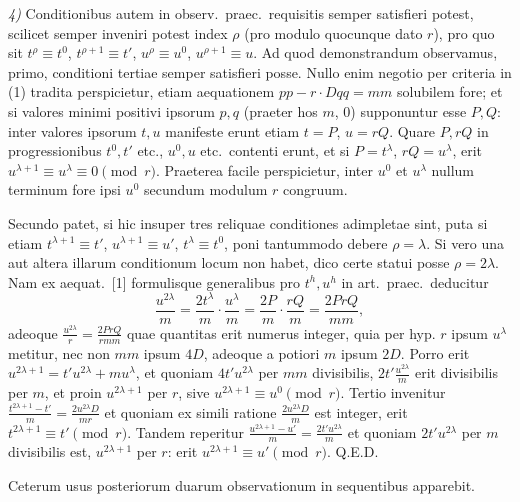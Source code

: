 \documentclass[12pt,a4paper]{article}
\theoremstyle{plain}
\theoremstyle{definition}
\theoremstyle{remark}
\begin{document}
\emph{4)} Conditionibus autem in observ.\ praec.\ requisitis semper satisfieri potest, scilicet semper inveniri potest index $\rho$ (pro modulo quocunque dato $r$), pro quo sit $t^\rho\equiv t^0$, $t^{\rho+1}\equiv t'$, $u^\rho\equiv u^0$, $u^{\rho+1}\equiv u$. Ad quod demonstrandum observamus, primo, conditioni tertiae semper satisfieri posse. Nullo enim negotio per criteria in (1) tradita perspicietur, etiam aequationem $pp-r\cdot Dqq=mm$ solubilem fore; et si valores minimi positivi ipsorum $p,q$ (praeter hos $m$, $0$) supponuntur esse $P,Q$: inter valores ipsorum $t,u$ manifeste erunt etiam $t=P$, $u=rQ$. Quare $P,rQ$ in progressionibus $t^0,t'$ etc., $u^0,u$ etc.\ contenti erunt, et si $P=t^\lambda$, $rQ=u^\lambda$, erit $u^{\lambda+1}\equiv u^\lambda\equiv0\pmod{r}$. Praeterea facile perspicietur, inter $u^0$ et $u^\lambda$ nullum terminum fore ipsi $u^0$ secundum modulum $r$ congruum.

Secundo patet, si hic insuper tres reliquae conditiones adimpletae sint, puta si etiam $t^{\lambda+1}\equiv t'$, $u^{\lambda+1}\equiv u'$, $t^\lambda\equiv t^0$, poni tantummodo debere $\rho=\lambda$. Si vero una aut altera illarum conditionum locum non habet, dico certe statui posse $\rho=2\lambda$. Nam ex aequat.\ [1] formulisque generalibus pro $t^h,u^h$ in art.\ praec.\ deducitur
\[
\frac{u^{2\lambda}}{m}=\frac{2t^\lambda}{m}\cdot\frac{u^\lambda}{m}=\frac{2P}{m}\cdot\frac{rQ}{m}=\frac{2PrQ}{mm},
\]
adeoque $\frac{u^{2\lambda}}{r}=\frac{2PrQ}{rmm}$ quae quantitas erit numerus integer, quia per hyp. $r$ ipsum $u^\lambda$ metitur, nec non $mm$ ipsum $4D$, adeoque a potiori $m$ ipsum $2D$. Porro erit $u^{2\lambda+1}=t'u^{2\lambda}+mu^\lambda$, et quoniam $4t'u^{2\lambda}$ per $mm$ divisibilis, $2t'\frac{u^{2\lambda}}{m}$ erit divisibilis per $m$, et proin $u^{2\lambda+1}$ per $r$, sive $u^{2\lambda+1}\equiv u^0\pmod{r}$. Tertio invenitur $\frac{t^{2\lambda+1}-t'}{m}=\frac{2u^{2\lambda}D}{mr}$ et quoniam ex simili ratione $\frac{2u^{2\lambda}D}{m}$ est integer, erit $t^{2\lambda+1}\equiv t'\pmod{r}$. Tandem reperitur $\frac{u^{2\lambda+1}-u'}{m}=\frac{2t'u^{2\lambda}}{m}$ et quoniam $2t'u^{2\lambda}$ per $m$ divisibilis est, $u^{2\lambda+1}$ per $r$: erit $u^{2\lambda+1}\equiv u'\pmod{r}$. Q.E.D.

Ceterum usus posteriorum duarum observationum in sequentibus apparebit.
\end{document}
